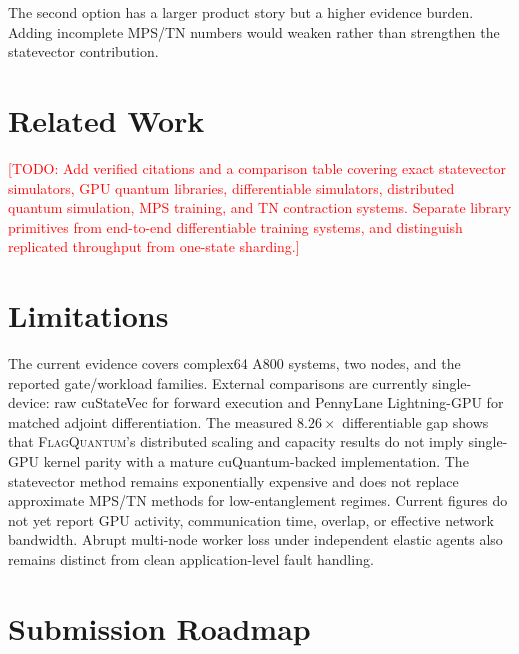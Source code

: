 \documentclass[10pt,twocolumn]{article}
\newcommand{\system}{\textsc{FlagQuantum}}
\newcommand{\todo}[1]{\textcolor{red}{[TODO: #1]}}
\begin{document}
The second option has a larger product story but a higher evidence burden.
Adding incomplete MPS/TN numbers would weaken rather than strengthen the
statevector contribution.

\section{Related Work}

\todo{Add verified citations and a comparison table covering exact
statevector simulators, GPU quantum libraries, differentiable simulators,
distributed quantum simulation, MPS training, and TN contraction systems.
Separate library primitives from end-to-end differentiable training systems,
and distinguish replicated throughput from one-state sharding.}

\section{Limitations}

The current evidence covers complex64 A800 systems, two nodes, and the reported
gate/workload families.  External comparisons are currently single-device:
raw cuStateVec for forward execution and PennyLane Lightning-GPU for matched
adjoint differentiation.  The measured \(8.26\times\) differentiable gap shows
that \system's distributed scaling and capacity results do not imply
single-GPU kernel parity with a mature cuQuantum-backed implementation.  The
statevector method remains exponentially expensive and does not replace
approximate MPS/TN methods for low-entanglement regimes.  Current figures do
not yet report GPU activity, communication time, overlap, or effective network
bandwidth.  Abrupt multi-node worker loss under independent elastic agents
also remains distinct from clean application-level fault handling.

\section{Submission Roadmap}
\label{sec:roadmap}
\end{document}

